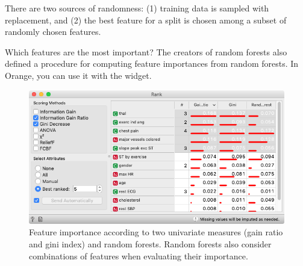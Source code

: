 There are two sources of randomness: (1) training data is sampled with replacement, and (2) the best feature for a split is chosen among a subset of randomly chosen features.

Which features are the most important? The creators of random forests also defined a procedure for computing feature importances from random forests. In Orange, you can use it with the  widget.

\begin{figure}[h]
    \centering
    \includegraphics[scale=0.35]{rank.png}
    \caption{Feature importance according to two univariate measures (gain ratio and gini index) and random forests. Random forests also consider combinations of features when evaluating their importance. }
\end{figure}
